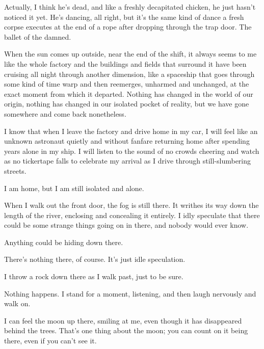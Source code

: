 Actually, I think he's dead, and like a freshly decapitated
chicken, he just hasn't noticed it yet. He's dancing,
all right, but it's the same kind of dance a fresh corpse
executes at the end of a rope after dropping through the trap door.
The ballet of the damned.



When the sun comes up outside, near the end of the shift, it always
seems to me like the whole factory and the buildings and fields
that surround it have been cruising all night through another
dimension, like a spaceship that goes through some kind of time
warp and then reemerges, unharmed and unchanged, at the exact
moment from which it departed. Nothing has changed in the world of
our origin, nothing has changed in our isolated pocket of reality,
but we have gone somewhere and come back nonetheless.



I know that when I leave the factory and drive home in my car, I
will feel like an unknown astronaut quietly and without fanfare
returning home after spending years alone in my ship. I will listen
to the sound of no crowds cheering and watch as no tickertape falls
to celebrate my arrival as I drive through still-slumbering
streets.



I am home, but I am still isolated and alone.



When I walk out the front door, the fog is still there. It writhes
its way down the length of the river, enclosing and concealing it
entirely. I idly speculate that there could be some strange things
going on in there, and nobody would ever know.



Anything could be hiding down there.



There's nothing there, of course. It's just idle
speculation.



I throw a rock down there as I walk past, just to be sure.



Nothing happens. I stand for a moment, listening, and then laugh
nervously and walk on.



I can feel the moon up there, smiling at me, even though it has
disappeared behind the trees. That's one thing about the
moon; you can count on it being there, even if you can't see
it.



